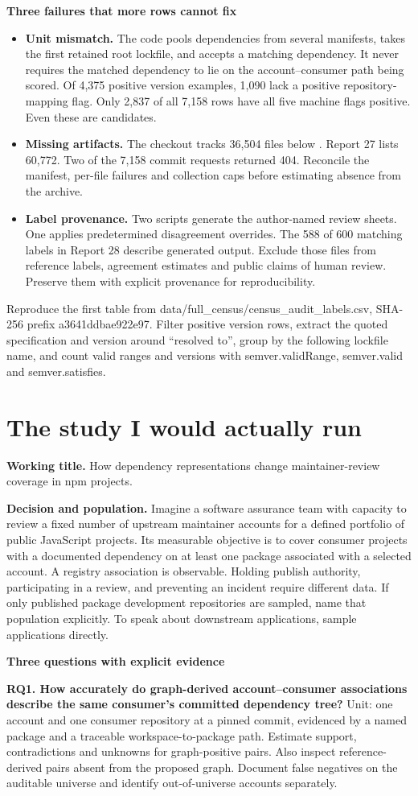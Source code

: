 \documentclass[11pt,a4paper]{article}
\newcommand{\pg}[1]{\newpage\section{\color{ink}#1}}
\newcommand{\hd}[1]{\par\textbf{\color{accent}#1}\par\nopagebreak}
\newcommand{\code}[1]{\texttt{\detokenize{#1}}}
\begin{document}
\hd{Three failures that more rows cannot fix}
\begin{itemize}
\item \textbf{Unit mismatch.} The code pools dependencies from several manifests, takes the first retained root lockfile, and accepts a matching dependency. It never requires the matched dependency to lie on the account--consumer path being scored. Of 4,375 positive version examples, 1,090 lack a positive repository-mapping flag. Only 2,837 of all 7,158 rows have all five machine flags positive. Even these are candidates.
\item \textbf{Missing artifacts.} The checkout tracks 36,504 files below \code{data/full_census/source_text/}. Report 27 lists 60,772. Two of the 7,158 commit requests returned 404. Reconcile the manifest, per-file failures and collection caps before estimating absence from the archive.
\item \textbf{Label provenance.} Two scripts generate the author-named review sheets. One applies predetermined disagreement overrides. The 588 of 600 matching labels in Report 28 describe generated output. Exclude those files from reference labels, agreement estimates and public claims of human review. Preserve them with explicit provenance for reproducibility.
\end{itemize}
\small\textcolor{muted}{Reproduce the first table from data/full\_census/census\_audit\_labels.csv, SHA-256 prefix a3641ddbae922e97. Filter positive version rows, extract the quoted specification and version around “resolved to”, group by the following lockfile name, and count valid ranges and versions with semver.validRange, semver.valid and semver.satisfies.}
\pg{The study I would actually run}
\textbf{Working title.} How dependency representations change maintainer-review coverage in npm projects.

\textbf{Decision and population.} Imagine a software assurance team with capacity to review a fixed number of upstream maintainer accounts for a defined portfolio of public JavaScript projects. Its measurable objective is to cover consumer projects with a documented dependency on at least one package associated with a selected account. A registry association is observable. Holding publish authority, participating in a review, and preventing an incident require different data. If only published package development repositories are sampled, name that population explicitly. To speak about downstream applications, sample applications directly.

\hd{Three questions with explicit evidence}
\textbf{RQ1. How accurately do graph-derived account--consumer associations describe the same consumer's committed dependency tree?} Unit: one account and one consumer repository at a pinned commit, evidenced by a named package and a traceable workspace-to-package path. Estimate support, contradictions and unknowns for graph-positive pairs. Also inspect reference-derived pairs absent from the proposed graph. Document false negatives on the auditable universe and identify out-of-universe accounts separately.
\end{document}
